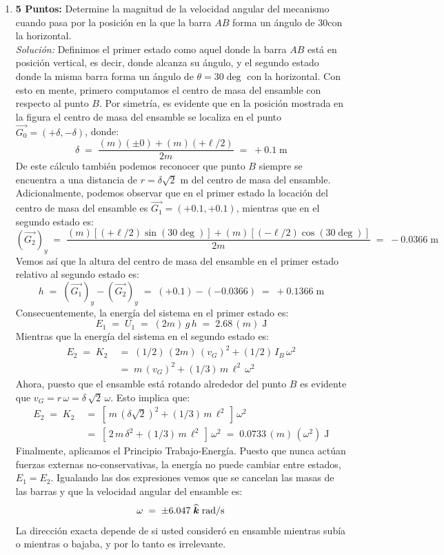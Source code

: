 \documentclass[ a4paper, twoside, 11pt]{article}
\begin{document}
\begin{problem}
\begin{enumerate}[label=\textbf{\alph*)}]
\item \textbf{5 Puntos:} Determine la magnitud de la velocidad angular del mecanismo cuando pasa por la posici\'on en la que la barra $AB$ forma un \'angulo de 30\deg con la horizontal. \\[1ex]
\emph{Soluci\'on:} Definimos el primer estado como aquel donde la barra $AB$ est\'a en posici\'on vertical, es decir, donde alcanza su \'angulo, y el segundo estado donde la misma barra forma un \'angulo de $\theta = 30\deg$ con la horizontal. Con esto en mente, primero computamos el centro de masa del ensamble con respecto al punto $B$. Por simetr\'ia, es evidente que en la posici\'on mostrada en la figura el centro de masa del ensamble se localiza en el punto $\vec{G_0} = (+\delta,-\delta)$, donde: 
\[
\delta \; = \; 
\frac{(m)(\pm 0) + (m)(+\ell/2)}{2m} \; = \; +0.1 \; \text{m}
\]
De este c\'alculo tambi\'en podemos reconocer que punto $B$ siempre se encuentra a una distancia de $r = \delta \sqrt{2}$ m del centro de masa del ensamble. Adicionalmente, podemos observar que en el primer estado la locaci\'on del centro de masa del ensamble es $\vec{G_1} = (+0.1,+0.1)$, mientras que en el segundo estado es: 
\[
(\vec{G_2})_y \; = \;
\frac{ (m)[ (+\ell/2) \sin(30\deg) ] + (m)[ (-\ell/2) \cos(30\deg)] }{2m}
\; = \; -0.0366 \; \text{m}
\]
Vemos as\'i que la altura del centro de masa del ensamble en el primer estado relativo al segundo estado es: 
\[
h \; = \; (\vec{G_1})_y - (\vec{G_2})_y
\; = \; (+0.1) - (-0.0366) \; = \; +0.1366 \; \text{m}
\]
Consecuentemente, la energ\'ia del sistema en el primer estado es: 
\[
E_1 \; = \; U_1 \; = \; (2m) \, g \, h \; = \; 2.68 \, (m) \; \text{J}
\]
Mientras que la energ\'ia del sistema en el segundo estado es: 
\begin{align*}
E_2 \; = \; K_2 \;
& = \;
(1/2) \, (2m) \, (v_G)^2 + (1/2) \, I_B \, \omega^2 \\
& = \;
m \, (v_G)^2 + (1/3) \, m \, \ell^2 \, \omega^2
\end{align*}
Ahora, puesto que el ensamble est\'a rotando alrededor del punto $B$ es evidente que $v_G = r \, \omega = \delta \, \sqrt{2} \, \omega$. Esto implica que: 
\begin{align*}
E_2 \; = \; K_2 \;
& = \; [ \, m \, (\delta \sqrt{2})^2 + (1/3) \, m \, \ell^2 \, ] \, \omega^2 \\
& = \; [ \, 2 \, m \, \delta^2 + (1/3) \, m \, \ell^2 \, ] \, \omega^2
\; = \; 0.0733 \, (m) \, (\omega^2) \; \text{J}
\end{align*}
Finalmente, aplicamos el Principio Trabajo-Energ\'ia. Puesto que nunca act\'uan fuerzas externas no-conservativas, la energ\'ia no puede cambiar entre estados, \ie $E_1 = E_2$. Igualando las dos expresiones vemos que se cancelan las masas de las barras y que la velocidad angular del ensamble es: 
\[
\omega \; = \; \pm 6.047 \; {\boldsymbol{\widehat{k}}} \; \text{rad/s}
\]
La direcci\'on exacta depende de si usted consider\'o en ensamble mientras sub\'ia o mientras o bajaba, y por lo tanto es irrelevante. 
\QED

\end{enumerate}

\end{problem}
\fullskip
\end{document}
